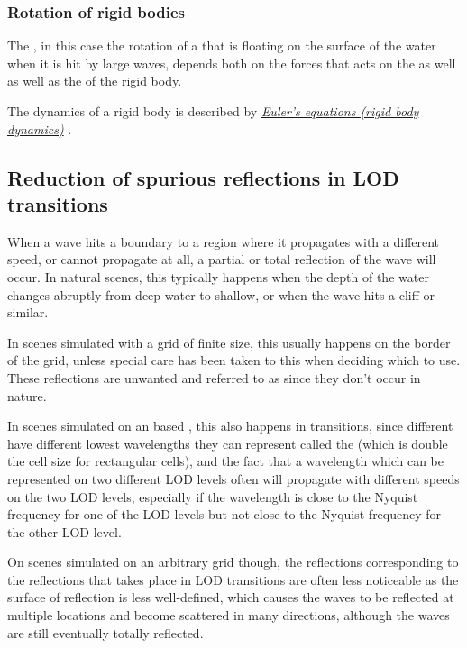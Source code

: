 \subsubsection{Rotation of rigid bodies}

The , in this case the rotation of a \ship that is floating on the surface of the water when it is hit by large waves, depends both on the forces that acts on the  as well as well as the   of the rigid body.

The dynamics of a rigid body is described by \textit{\href{http://en.wikipedia.org/wiki/Euler\%27s_equations_\%28rigid_body_dynamics\%29}{Euler's equations (rigid body dynamics)}} \citep{temp}.

\subsection{Reduction of spurious reflections in LOD transitions}

When a wave hits a boundary to a region where it propagates with a different speed, or cannot propagate at all, a partial or total reflection of the wave will occur. In natural scenes, this typically happens when the depth of the water changes abruptly from deep water to shallow, or when the wave hits a cliff or similar.

In scenes simulated with a grid of finite size, this usually happens on the border of the grid, unless special care has been taken to this when deciding which  to use. These reflections are unwanted and referred to as  since they don't occur in nature.

In scenes simulated on an \octree based \grid, this also happens in \LOD transitions, since different  have different lowest wavelengths they can represent called the  (which is double the cell size for rectangular cells), and the fact that a wavelength which can be represented on two different LOD levels often will propagate with different speeds on the two LOD levels, especially if the wavelength is close to the Nyquist frequency for one of the LOD levels but not close to the Nyquist frequency for the other LOD level.

On scenes simulated on an arbitrary grid though, the reflections corresponding to the reflections that takes place in LOD transitions are often less noticeable as the surface of reflection is less well-defined, which causes the waves to be reflected at multiple locations and become scattered in many directions, although the waves are still eventually totally reflected.

